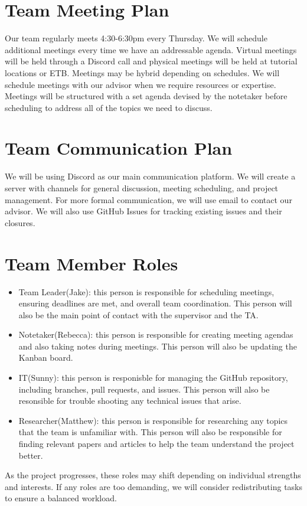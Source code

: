 \documentclass{article}
\begin{document}
\section{Team Meeting Plan}

\raggedright
Our team regularly meets 4:30-6:30pm every Thursday.
We will schedule additional meetings every time we have an addressable 
agenda. Virtual meetings will be held through a Discord call 
and physical meetings will be held at tutorial locations or ETB.
 Meetings may be hybrid depending on schedules. We will schedule
  meetings with our advisor when we require resources or 
  expertise. Meetings will be structured with a set agenda devised by the notetaker
  before scheduling to address all of the topics we need to discuss.

\section{Team Communication Plan}

\raggedright
We will be using Discord as our main communication 
platform. We will create a server with channels for general 
discussion, meeting scheduling, and project management.
For more formal communication, we will use email to contact 
our advisor.
We will also use GitHub Issues for tracking existing 
issues and their closures.


\section{Team Member Roles}

\raggedright
\begin{itemize}
  \item Team Leader(Jake): this person is responsible for scheduling meetings,
    ensuring deadlines are met, and overall team coordination. This person will
    also be the main point of contact with the supervisor and the TA.
  \item Notetaker(Rebecca): this person is responsible for creating meeting agendas and also
    taking notes during meetings. This person will also be updating the Kanban
    board.
  \item IT(Sunny): this person is responisble for managing the GitHub repository, including
    branches, pull requests, and issues. This person will also be resonsible for trouble
    shooting any technical issues that arise.
  \item Researcher(Matthew): this person is responsible for researching any topics that
    the team is unfamiliar with. This person will also be responsible for finding
    relevant papers and articles to help the team understand the project better.
\end{itemize}
As the project progresses, these roles may shift depending on individual strengths
and interests. If any roles are too demanding, we will consider redistributing tasks to
ensure a balanced workload.
\end{document}
